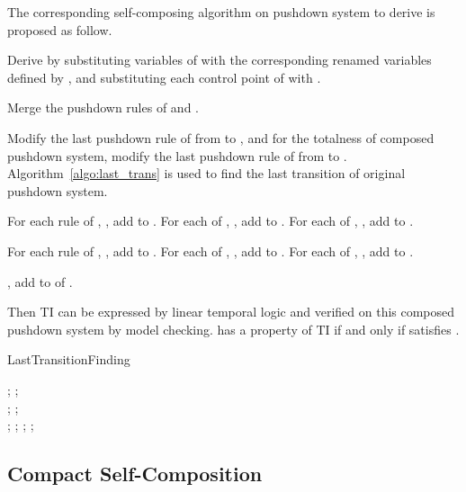 \documentclass{llncs}
\begin{document}
The corresponding self-composing algorithm on pushdown system to
derive  is proposed
as follow.
\begin{compactenum}[1.]
\item Derive  by substituting variables of  with the corresponding renamed
variables defined by , and substituting each control point
 of  with .
\item Merge the pushdown rules of  and .
\item Modify the last pushdown rule of  from
 to , and for the totalness of composed
pushdown system, modify the last pushdown rule of 
from  to .
Algorithm~\ref{algo:last_trans} is used to find the last transition
of original pushdown system.
\item For each rule of , , add
 to . For each  of , , add  to . For each
 of
, , add
 to .
\item For each rule of , , add
 to . For each  of , , add  to . For
each  of , , add  to .
\item , add  to  of
.
\end{compactenum}
Then TI can be expressed by linear temporal logic and verified on
this composed pushdown system by model checking.  has
a property of TI if and only if  satisfies .

\begin{algorithm}
\caption{\label{algo:last_trans}LastTransitionFinding}
; ;\\
\While {} {
    ; ;\\
    \ForAll {} {
        \uIf {} {;}
        \uIf {} {;}
        \uIf {} {\Return ;}
    }
    ;
}
\end{algorithm}

\subsection{\label{subsec:csc}Compact Self-Composition}
\end{document}
